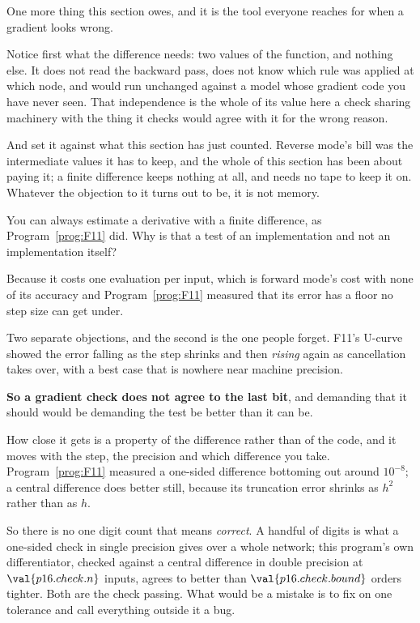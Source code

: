 \begin{fr}
One more thing this section owes, and it is the tool everyone reaches for when
a gradient looks wrong.

Notice first what the difference needs: two values of the function, and
nothing else. It does not read the backward pass, does not know which rule was
applied at which node, and would run unchanged against a model whose gradient
code you have never seen. That independence is the whole of its value here
\dash{} a check sharing machinery with the thing it checks would agree with it
for the wrong reason.

And set it against what this section has just counted. Reverse mode's bill was
the intermediate values it has to keep, and the whole of this section has been
about paying it; a finite difference keeps nothing at all, and needs no tape to
keep it on. Whatever the objection to it turns out to be, it is not memory.

You can always estimate a derivative with a finite difference, as
Program~\ref{prog:F11} did. Why is that a test of an implementation and not an
implementation itself?
\dotline
\nextframe
\end{fr}

\begin{fr}
\begin{ansblock}
Because it costs one evaluation per input, which is forward mode's cost with
none of its accuracy \dash{} and Program~\ref{prog:F11} measured that its
error has a floor no step size can get under.
\end{ansblock}

Two separate objections, and the second is the one people forget. F11's
U-curve showed the error falling as the step shrinks and then \emph{rising}
again as cancellation takes over, with a best case that is nowhere near
machine precision.

\textbf{So a gradient check does not agree to the last bit}, and demanding
that it should would be demanding the test be better than it can be.

How close it gets is a property of the difference rather than of the code, and
it moves with the step, the precision and which difference you take.
Program~\ref{prog:F11} measured a one-sided difference bottoming out around
$10^{-8}$; a central difference does better still, because its truncation
error shrinks as $h^{2}$ rather than as $h$.

So there is no one digit count that means \emph{correct}. A handful of digits
is what a one-sided check in single precision gives over a whole network; this
program's own differentiator, checked against a central difference in double
precision at $\val{p16.check.n}$ inputs, agrees to better than
$\val{p16.check.bound}$ \dash{} orders tighter. Both are the check passing.
What would be a mistake is to fix on one tolerance and call everything outside
it a bug.
\end{fr}

